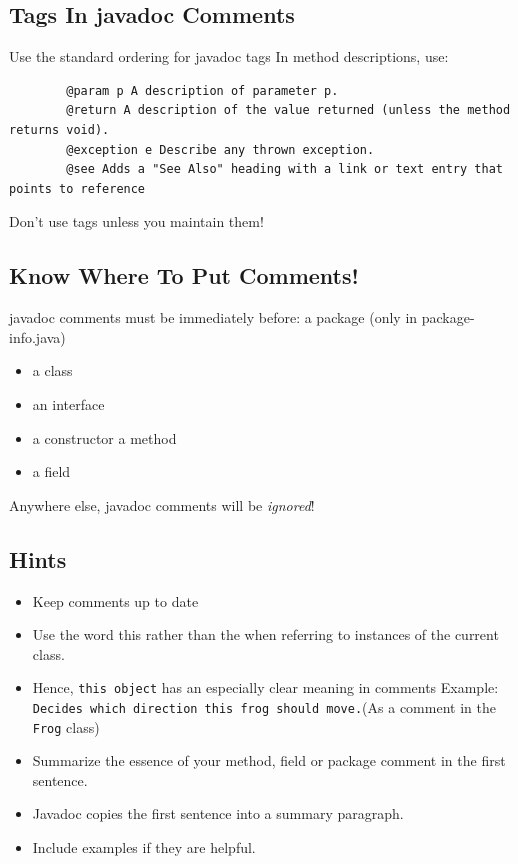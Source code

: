 \documentclass[10pt]{article}
\begin{document}
    \subsection{Tags In javadoc Comments}
    Use the standard ordering for javadoc tags
    In method descriptions, use:
    \begin{verbatim}
        @param p A description of parameter p.
        @return A description of the value returned (unless the method returns void).
        @exception e Describe any thrown exception.
        @see Adds a "See Also" heading with a link or text entry that points to reference
    \end{verbatim}
    Don\textquoteright t use tags unless you maintain them!

    \subsection{Know Where To Put Comments!}
    javadoc comments must be immediately before: a package (only in package-info.java)
    \begin{itemize}
        \item a class
        \item an interface
        \item a constructor a method
        \item a field
    \end{itemize}
    Anywhere else, javadoc comments will be \textit{ignored}!

    \subsection{Hints}
    \begin{itemize}
        \item Keep comments up to date
        \item Use the word \grqq this \grqq rather than \grqq the \grqq when referring to instances of the current class.
        \item Hence, \texttt{this object} has an especially clear meaning in comments Example: \texttt{Decides which direction this frog should move.}(As a comment in the \texttt{Frog} class)
        \item Summarize the essence of your method, field or package comment in the first sentence.
        \item Javadoc copies the first sentence into a summary paragraph.
        \item Include examples if they are helpful.
    \end{itemize}
	\newpage
	
\end{document}
